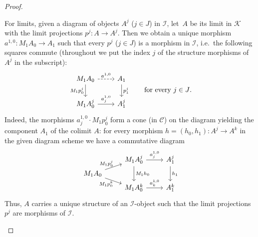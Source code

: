 \documentclass[sigconf,
			final%
			nonacm
                        ]{acmart}
\numberwithin{equation}{section}
\numberwithin{equation}{section}
\theoremstyle{plain}
\theoremstyle{definition}
\newcommand{\CatC}{\mathscr{C}}           %
\newcommand{\CatK}{\mathscr{K}}
\newcommand{\CatI}{\mathscr{I}}
\begin{document}
\begin{proof}
\begin{enumerate}
    For limits, given a diagram of objects $A^j$ ($j\in J$) in
    $\CatI$, let~$A$ be its limit in $\CatK$ with the limit projections
    $p^j\colon A \to A^j$. Then we obtain a unique morphism
    $a^{1,0}\colon M_1 A_0 \to A_1$ such that every $p^j$ ($j \in J$)
    is a morphism in $\CatI$, i.e.~the following squares commute
    (throughout we put the index $j$ of the structure morphisms of
    $A^j$ in the subscript):
    \[
      \begin{tikzcd}
        M_1A_0
        \ar[dashed]{r}{a^{1,0}}
        \ar{d}[swap]{M_1 p^j_0}
        &
        A_1
        \ar{d}{p^j_1}
        \\
        M_1A^j_0
        \ar{r}{a^{1,0}_j}
        &
        A^j_1
      \end{tikzcd}
      \qquad
      \text{for every $j \in J$}.
    \]
    Indeed, the morphisms $a^{1,0}_j \cdot M_1p^j_0$ form a cone (in
    $\CatC$) on the diagram yielding the component $A_1$ of the
    colimit $A$: for every morphism $h = (h_0, h_1)\colon A^j \to A^k$
    in the given diagram scheme we have a commutative diagram
    \[
      \begin{tikzcd}[row sep = 3]
        &
        M_1A^j_0
        \ar{r}{a^{1,0}_j}
        \ar{dd}{M_1h_0}
        &
        A^j_1
        \ar{dd}{h_1}
        \\
        M_1A_0
        \ar{ru}[inner sep =0]{M_1p^j_0}
        \ar{rd}[swap, inner sep =0]{M_1p^k_0}
        \\
        &
        M_1A^k_0
        \ar{r}{a^{1,0}_k}
        &
        A^k_1
      \end{tikzcd}
    \]
    Thus, $A$ carries a unique structure of an $\CatI$-object such
    that the limit projections $p^j$ are morphisms of $\CatI$.


\end{enumerate}
\end{proof}
\end{document}
